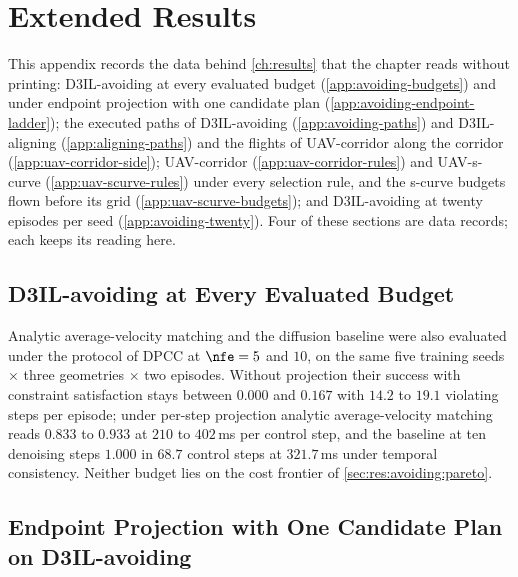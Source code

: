 \chapter{Extended Results}\label{app:results}

This appendix records the data behind \autoref{ch:results} that the chapter reads without printing:
D3IL-avoiding at every evaluated budget (\autoref{app:avoiding-budgets}) and under endpoint projection
with one candidate plan (\autoref{app:avoiding-endpoint-ladder}); the executed paths of D3IL-avoiding
(\autoref{app:avoiding-paths}) and D3IL-aligning (\autoref{app:aligning-paths}) and the flights of
UAV-corridor along the corridor (\autoref{app:uav-corridor-side}); UAV-corridor
(\autoref{app:uav-corridor-rules}) and UAV-s-curve (\autoref{app:uav-scurve-rules}) under every
selection rule, and the s-curve budgets flown before its grid (\autoref{app:uav-scurve-budgets}); and
D3IL-avoiding at twenty episodes per seed (\autoref{app:avoiding-twenty}). Four of these sections are
data records; each keeps its reading here. 

\section{D3IL-avoiding at Every Evaluated Budget}\label{app:avoiding-budgets}

Analytic average-velocity matching and the diffusion baseline were also evaluated under the protocol
of \ac{DPCC} at $\nfe = 5$ and $10$, on the same five training seeds $\times$ three geometries $\times$
two episodes. Without projection their success with constraint satisfaction stays between $0.000$ and
$0.167$ with $14.2$ to $19.1$ violating steps per episode; under per-step projection analytic
average-velocity matching reads $0.833$ to $0.933$ at $210$ to $402$\,ms per control step, and the
baseline at ten denoising steps $1.000$ in $68.7$ control steps at $321.7$\,ms under temporal
consistency. Neither budget lies on the cost frontier of \autoref{sec:res:avoiding:pareto}.
\ifappendixfull

\else
\label{tab:app:avoiding-raw-full}\label{tab:app:avoiding-dpcc-full}
\fi

\section{Endpoint Projection with One Candidate Plan on D3IL-avoiding}\label{app:avoiding-endpoint-ladder}


